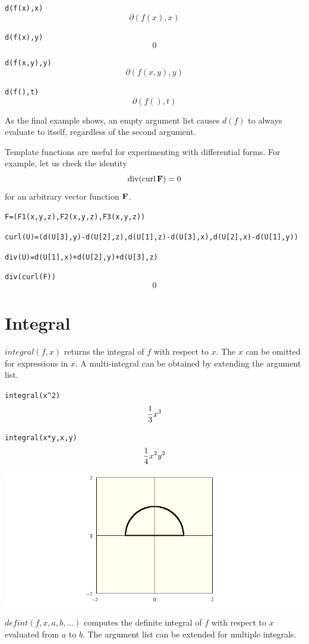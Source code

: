 \documentclass[12pt]{book}
\begin{document}
\medskip
\verb$d(f(x),x)$
$$\partial(f(x),x)$$

\verb$d(f(x),y)$
$$0$$

\verb$d(f(x,y),y)$
$$\partial(f(x,y),y)$$

\verb$d(f(),t)$
$$\partial(f(),t)$$

\medskip
\noindent
As the final example shows, an empty argument list causes
$d(f)$ to always evaluate to itself, regardless
of the second argument.

\medskip
\noindent
Template functions are useful for experimenting with differential forms.
For example, let us check the identity
$$\mathop{\rm div}(\mathop{\rm curl}{\bf F})=0$$
for an arbitrary vector function $\bf F$.

\medskip
\verb$F=(F1(x,y,z),F2(x,y,z),F3(x,y,z))$

\verb$curl(U)=(d(U[3],y)-d(U[2],z),d(U[1],z)-d(U[3],x),d(U[2],x)-d(U[1],y))$

\verb$div(U)=d(U[1],x)+d(U[2],y)+d(U[3],z)$

\verb$div(curl(F))$
$$0$$

\newpage

\chapter{Integral}

\label{integral}

\noindent
$integral(f,x)$ returns the integral of $f$ with respect to $x$.
The $x$ can be omitted for expressions in $x$.
A multi-integral can be obtained by extending the argument list.

\medskip
\verb$integral(x^2)$
$${1\over3}x^3$$

\verb$integral(x*y,x,y)$
$${1\over4}x^2y^2$$

\newpage

\noindent
\includegraphics[scale=0.5]{semicircle.png}

\medskip
\noindent
$defint(f,x,a,b,\ldots)$
computes the definite integral of $f$ with respect to $x$ evaluated from $a$ to $b$.
The argument list can be extended for multiple integrals.
\end{document}
